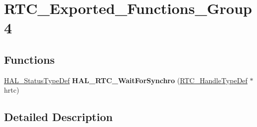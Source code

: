 \hypertarget{group___r_t_c___exported___functions___group4}{}\section{R\+T\+C\+\_\+\+Exported\+\_\+\+Functions\+\_\+\+Group4}
\label{group___r_t_c___exported___functions___group4}
\subsection*{Functions}
\begin{DoxyCompactItemize}
\item 
\hyperlink{stm32f4xx__hal__def_8h_a63c0679d1cb8b8c684fbb0632743478f}{H\+A\+L\+\_\+\+Status\+Type\+Def} {\bfseries H\+A\+L\+\_\+\+R\+T\+C\+\_\+\+Wait\+For\+Synchro} (\hyperlink{struct_r_t_c___handle_type_def}{R\+T\+C\+\_\+\+Handle\+Type\+Def} $\ast$hrtc)\hypertarget{group___r_t_c___exported___functions___group4_ga62efc08017f7dc4db0bc72f7c68085ad}{}\label{group___r_t_c___exported___functions___group4_ga62efc08017f7dc4db0bc72f7c68085ad}

\end{DoxyCompactItemize}


\subsection{Detailed Description}
